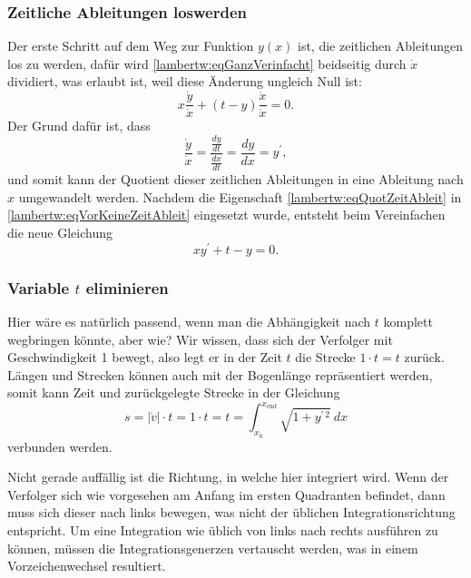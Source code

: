 \subsubsection{Zeitliche Ableitungen loswerden
	\label{lambertw:subsubsection:ZeitAbleit}}
Der erste Schritt auf dem Weg zur Funktion \(y(x)\) ist, die zeitlichen Ableitungen los zu werden, dafür wird \eqref{lambertw:eqGanzVerinfacht} beidseitig durch \(\dot{x}\) dividiert, was erlaubt ist, weil diese Änderung ungleich Null ist:
\begin{equation}
	x \frac{\dot{y}}{\dot{x}} + (t-y) \frac{\dot{x}}{\dot{x}}
	= 0.
	\label{lambertw:eqVorKeineZeitAbleit}
\end{equation}
Der Grund dafür ist, dass
\begin{equation}
	\frac{\displaystyle\dot{y}}{\displaystyle\dot{x}} 
	= \frac{\displaystyle\frac{dy}{dt}}{\displaystyle\frac{dx}{dt}}  
	= \frac{dy}{dx}
	= y^{\prime},
	\label{lambertw:eqQuotZeitAbleit}
\end{equation}
und somit kann der Quotient dieser zeitlichen Ableitungen in eine Ableitung nach \(x\) umgewandelt werden.
Nachdem die Eigenschaft \eqref{lambertw:eqQuotZeitAbleit} in \eqref{lambertw:eqVorKeineZeitAbleit} eingesetzt wurde, entsteht beim Vereinfachen die neue Gleichung
\begin{equation}
	x y^{\prime} + t - y
	= 0.
	\label{lambertw:DGLmitT}
\end{equation}

\subsubsection{Variable \(t\) eliminieren
	\label{lambertw:subsubsection:VarTelimin}}
Hier wäre es natürlich passend, wenn man die Abhängigkeit nach \(t\) komplett wegbringen könnte, aber wie?
Wir wissen, dass sich der Verfolger mit Geschwindigkeit 1 bewegt, also legt er in der Zeit \(t\) die Strecke \(1\cdot t = t\) zurück. Längen und Strecken können auch mit der Bogenlänge repräsentiert werden, somit kann Zeit und zurückgelegte Strecke in der Gleichung  
\begin{equation}
	s
	= 
	|\dot{v}| \cdot t
	=
	1 \cdot t
	=
	t
	=
	\int_{\displaystyle x_0}^{\displaystyle x_{\text{end}}}\sqrt{1+y^{\prime\, 2}} \: dx
	\label{lambertw:eqZuBogenlaenge}
\end{equation}
verbunden werden.
  
Nicht gerade auffällig ist die Richtung, in welche hier integriert wird. Wenn der Verfolger sich wie vorgesehen am Anfang im ersten Quadranten befindet, dann muss sich dieser nach links bewegen, was nicht der üblichen Integrationsrichtung entspricht. Um eine Integration wie üblich von links nach rechts ausführen zu können, müssen die Integrationsgenerzen vertauscht werden, was in einem Vorzeichenwechsel resultiert. 

